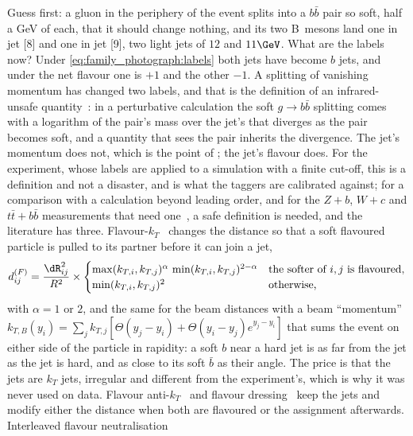 Guess first: a gluon in the periphery of the event splits into a $b\bar b$
pair so soft, half a GeV of \pt each, that it should change nothing, and
its two B~mesons land one in jet [8] and one in jet [9], two light jets of
$12$ and $11\GeV$. What are the labels now? Under
\cref{eq:family_photograph:labels} both jets have become $b$ jets, and
under the net flavour one is $+1$ and the other $-1$. A splitting of
vanishing momentum has changed two labels, and that is the definition of
an infrared-unsafe quantity~\cite{Sterman:1977wj,Salam:2009jx}: in a
perturbative calculation the soft $g\to b\bar b$ splitting comes with a
logarithm of the pair's mass over the jet's \pt that diverges as the pair
becomes soft, and a quantity that sees the pair inherits the divergence.
The jet's momentum does not, which is the point of \antikt; the jet's
flavour does. For the experiment, whose labels are applied to a
simulation with a finite cut-off, this is a definition and not a
disaster, and \hadflav is what the taggers are calibrated against; for a
comparison with a calculation beyond leading order, and for the $Z+b$,
$W+c$ and $t\bar t+b\bar b$ measurements that need
one~\cite{Banfi:2007gu,Gauld:2020deh}, a safe definition is needed, and
the literature has three. Flavour-$k_T$~\cite{Banfi:2006hf} changes the
distance so that a soft flavoured particle is pulled to its partner
before it can join a jet,
\begin{equation}
  \dij^{(F)}=\frac{\dR_{ij}^2}{R^2}\times\begin{cases}
    \max(k_{T,i},k_{T,j})^{\alpha}\,\min(k_{T,i},k_{T,j})^{2-\alpha} & \text{the softer of $i,j$ is flavoured,}\\
    \min(k_{T,i},k_{T,j})^2 & \text{otherwise,}\end{cases}
  \label{eq:family_photograph:fkt}
\end{equation}
with $\alpha=1$ or $2$, and the same for the beam distances with a beam
``momentum'' $k_{T,B}(y_i)=\sum_j k_{T,j}[\Theta(y_j-y_i)+\Theta(y_i-y_j)e^{y_j-y_i}]$
that sums the event on either side of the particle in rapidity: a soft
$b$ near a hard jet is as far from the jet as the jet is hard, and as
close to its soft $\bar b$ as their angle. The price is that the jets are
$k_T$ jets, irregular and different from the experiment's, which is why
it was never used on data. Flavour anti-$k_T$~\cite{Czakon:2022khx} and
flavour dressing~\cite{Gauld:2022lem} keep the \antikt jets and modify
either the distance when both are flavoured or the assignment
afterwards. Interleaved flavour neutralisation~\cite{Caletti:2022glq}
